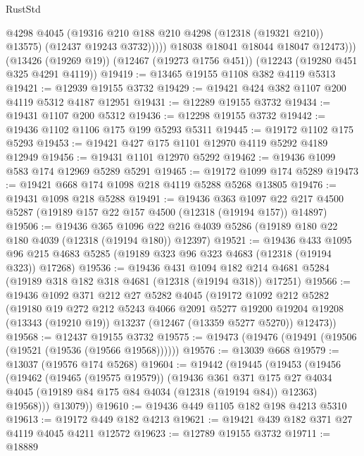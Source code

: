 \begin{lexlean}{RustStd}
\begin{coremodule}
                  @4298
                  @4045
                  (@19316 @210 @188 @210 @4298 (@12318 (@19321 @210)) @13575)
                  (@12437 @19243 @3732)))))
          @18038
          @18041
          @18044
          @18047
          @12473)))
    (@13426 (@19269 @19))
    (@12467 (@19273 @1756 @451))
    (@12243 (@19280 @451 @325 @4291 @4119))
@19419 := @13465 @19155 @1108 @382 @4119 @5313
@19421 := @12939 @19155 @3732
@19429 := @19421 @424 @382 @1107 @200 @4119 @5312 @4187 @12951
@19431 := @12289 @19155 @3732
@19434 := @19431 @1107 @200 @5312
@19436 := @12298 @19155 @3732
@19442 := @19436 @1102 @1106 @175 @199 @5293 @5311
@19445 := @19172 @1102 @175 @5293
@19453 := @19421 @427 @175 @1101 @12970 @4119 @5292 @4189 @12949
@19456 := @19431 @1101 @12970 @5292
@19462 := @19436 @1099 @583 @174 @12969 @5289 @5291
@19465 := @19172 @1099 @174 @5289
@19473 := @19421 @668 @174 @1098 @218 @4119 @5288 @5268 @13805
@19476 := @19431 @1098 @218 @5288
@19491 := @19436
    @363
    @1097
    @22
    @217
    @4500
    @5287
    (@19189 @157 @22 @157 @4500 (@12318 (@19194 @157)) @14897)
@19506 := @19436
    @365
    @1096
    @22
    @216
    @4039
    @5286
    (@19189 @180 @22 @180 @4039 (@12318 (@19194 @180)) @12397)
@19521 := @19436
    @433
    @1095
    @96
    @215
    @4683
    @5285
    (@19189 @323 @96 @323 @4683 (@12318 (@19194 @323)) @17268)
@19536 := @19436
    @431
    @1094
    @182
    @214
    @4681
    @5284
    (@19189 @318 @182 @318 @4681 (@12318 (@19194 @318)) @17251)
@19566 := @19436
    @1092
    @371
    @212
    @27
    @5282
    @4045
    (@19172
      @1092
      @212
      @5282
      (@19180
        @19
        @272
        @212
        @5243
        @4066
        @2091
        @5277
        @19200
        @19204
        @19208
        (@13343 (@19210 @19))
        @13237
        (@12467 (@13359 @5277 @5270))
        @12473))
@19568 := @12437 @19155 @3732
@19575 := @19473 (@19476 (@19491 (@19506 (@19521 (@19536 (@19566 @19568))))))
@19576 := @13039 @668
@19579 := @13037 (@19576 @174 @5268)
@19604 := @19442
    (@19445
      (@19453
        (@19456
          (@19462
            (@19465 (@19575 @19579))
            (@19436
              @361
              @371
              @175
              @27
              @4034
              @4045
              (@19189 @84 @175 @84 @4034 (@12318 (@19194 @84)) @12363)
              @19568)))
        @13079))
@19610 := @19436 @449 @1105 @182 @198 @4213 @5310
@19613 := @19172 @449 @182 @4213
@19621 := @19421 @439 @182 @371 @27 @4119 @4045 @4211 @12572
@19623 := @12789 @19155 @3732
@19711 := @18889

\end{coremodule}
\end{lexlean}
